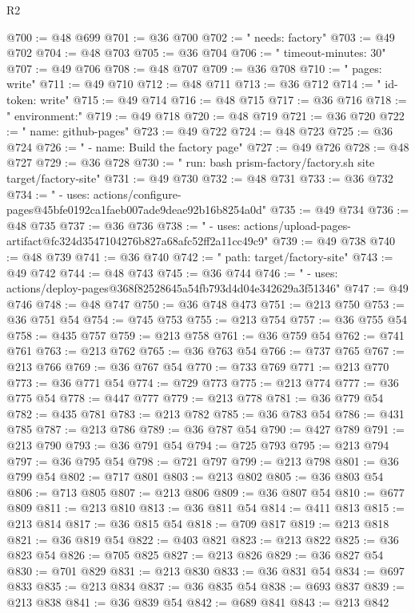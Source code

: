 \begin{lexlean}{R2}
\begin{coremodule}
@700 := @48 @699
@701 := @36 @700
@702 := "    needs: factory"
@703 := @49 @702
@704 := @48 @703
@705 := @36 @704
@706 := "    timeout-minutes: 30"
@707 := @49 @706
@708 := @48 @707
@709 := @36 @708
@710 := "      pages: write"
@711 := @49 @710
@712 := @48 @711
@713 := @36 @712
@714 := "      id-token: write"
@715 := @49 @714
@716 := @48 @715
@717 := @36 @716
@718 := "    environment:"
@719 := @49 @718
@720 := @48 @719
@721 := @36 @720
@722 := "      name: github-pages"
@723 := @49 @722
@724 := @48 @723
@725 := @36 @724
@726 := "      - name: Build the factory page"
@727 := @49 @726
@728 := @48 @727
@729 := @36 @728
@730 := "        run: bash prism-factory/factory.sh site target/factory-site"
@731 := @49 @730
@732 := @48 @731
@733 := @36 @732
@734 := "      - uses: actions/configure-pages@45bfe0192ca1faeb007ade9deae92b16b8254a0d"
@735 := @49 @734
@736 := @48 @735
@737 := @36 @736
@738 := "      - uses: actions/upload-pages-artifact@fc324d3547104276b827a68afc52ff2a11cc49c9"
@739 := @49 @738
@740 := @48 @739
@741 := @36 @740
@742 := "          path: target/factory-site"
@743 := @49 @742
@744 := @48 @743
@745 := @36 @744
@746 := "      - uses: actions/deploy-pages@368f82528645a54fb793d4d04e342629a3f51346"
@747 := @49 @746
@748 := @48 @747
@750 := @36 @748 @473
@751 := @213 @750
@753 := @36 @751 @54
@754 := @745 @753
@755 := @213 @754
@757 := @36 @755 @54
@758 := @435 @757
@759 := @213 @758
@761 := @36 @759 @54
@762 := @741 @761
@763 := @213 @762
@765 := @36 @763 @54
@766 := @737 @765
@767 := @213 @766
@769 := @36 @767 @54
@770 := @733 @769
@771 := @213 @770
@773 := @36 @771 @54
@774 := @729 @773
@775 := @213 @774
@777 := @36 @775 @54
@778 := @447 @777
@779 := @213 @778
@781 := @36 @779 @54
@782 := @435 @781
@783 := @213 @782
@785 := @36 @783 @54
@786 := @431 @785
@787 := @213 @786
@789 := @36 @787 @54
@790 := @427 @789
@791 := @213 @790
@793 := @36 @791 @54
@794 := @725 @793
@795 := @213 @794
@797 := @36 @795 @54
@798 := @721 @797
@799 := @213 @798
@801 := @36 @799 @54
@802 := @717 @801
@803 := @213 @802
@805 := @36 @803 @54
@806 := @713 @805
@807 := @213 @806
@809 := @36 @807 @54
@810 := @677 @809
@811 := @213 @810
@813 := @36 @811 @54
@814 := @411 @813
@815 := @213 @814
@817 := @36 @815 @54
@818 := @709 @817
@819 := @213 @818
@821 := @36 @819 @54
@822 := @403 @821
@823 := @213 @822
@825 := @36 @823 @54
@826 := @705 @825
@827 := @213 @826
@829 := @36 @827 @54
@830 := @701 @829
@831 := @213 @830
@833 := @36 @831 @54
@834 := @697 @833
@835 := @213 @834
@837 := @36 @835 @54
@838 := @693 @837
@839 := @213 @838
@841 := @36 @839 @54
@842 := @689 @841
@843 := @213 @842

\end{coremodule}
\end{lexlean}
